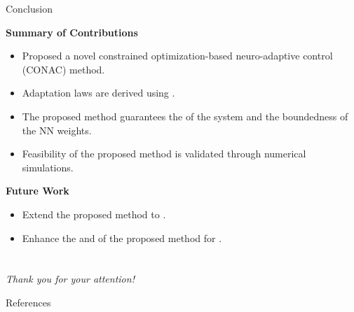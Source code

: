 \documentclass[8pt, aspectratio=169, handout]{beamer}
\newcommand{\ctxt}[2]{\color{#1}{#2}\color{black}}
\begin{document}
\begin{frame}{Conclusion}
    
  \textbf{Summary of Contributions}
  \begin{itemize}
    \item Proposed a novel constrained optimization-based neuro-adaptive control (CONAC) method.
    \item Adaptation laws are derived using \ctxt{airforceblue}{constrained optimization method}.
    \item The proposed method guarantees the \ctxt{awesome}{stability }of the system and the boundedness of the NN weights.
    \item Feasibility of the proposed method is validated through numerical simulations.
  \end{itemize}

  \textbf{Future Work}
  \begin{itemize}
    \item Extend the proposed method to \ctxt{airforceblue}{state constraints}.
    \item Enhance the \ctxt{awesome}{robustness }and \ctxt{awesome}{flexibility }of the proposed method for \ctxt{airforceblue}{various systems}.
  \end{itemize}

\end{frame}

\section{}
\begin{frame}{}
    \centering \Large
    \emph{Thank you for your attention!}
\end{frame}

\begin{frame}[allowframebreaks]{References}

  
  

\end{frame}
\end{document}
